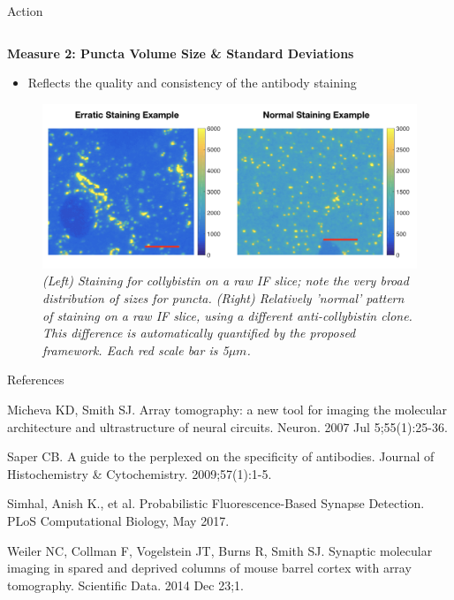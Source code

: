 \documentclass[final, table]{beamer}
\newlength{\onecolwid}
\newlength{\twocolwid}
\begin{document}
\begin{frame}[t]
\begin{columns}[t]
\begin{column}{\twocolwid}
\begin{block}{Action}
\begin{columns}[t]
\begin{column}{\onecolwid}
\textbf{Measure 2: Puncta Volume Size \& Standard Deviations} 

\begin{itemize} 
\item Reflects the quality and consistency of the antibody staining
\end{itemize} 


\begin{figure}
\centering
\includegraphics[width=1\textwidth]{figs/ab_sizevariance}
\caption{\textit{(Left) Staining for collybistin on a raw IF slice; note the very broad distribution of sizes for puncta. (Right) Relatively 'normal' pattern of staining on a raw IF slice, using a different anti-collybistin clone.  This difference is automatically quantified by the proposed framework. Each red scale bar is 5$\mu m$.} }

\end{figure}

\vspace{1in}

\begin{block}{References}
\tiny{
\begin{thebibliography}{99}


Micheva KD, Smith SJ. Array tomography: a new tool for imaging the molecular architecture and ultrastructure of neural circuits. Neuron. 2007 Jul 5;55(1):25-36.

 Saper CB. A guide to the perplexed on the specificity of antibodies. Journal of Histochemistry \& Cytochemistry. 2009;57(1):1-5.

Simhal, Anish K., et al. Probabilistic Fluorescence-Based Synapse Detection. PLoS Computational Biology, May 2017.

Weiler NC, Collman F, Vogelstein JT, Burns R, Smith SJ. Synaptic molecular imaging in spared and deprived columns of mouse barrel cortex with array tomography. Scientific Data. 2014 Dec 23;1.


\end{thebibliography}}
\end{block}
\end{column}
\end{columns}
\end{block}
\end{column}
\end{columns}
\end{frame}
\end{document}
